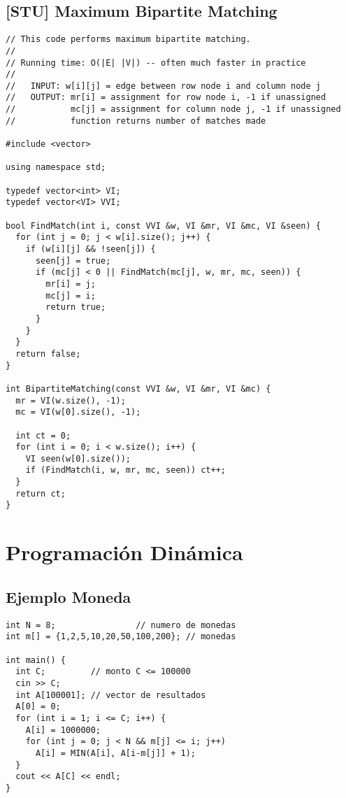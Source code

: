 \documentclass[10pt, a4, oneside]{article}
\begin{document}
\subsection{[STU] Maximum Bipartite Matching}
\begin{verbatim}
// This code performs maximum bipartite matching.
//
// Running time: O(|E| |V|) -- often much faster in practice
//
//   INPUT: w[i][j] = edge between row node i and column node j
//   OUTPUT: mr[i] = assignment for row node i, -1 if unassigned
//           mc[j] = assignment for column node j, -1 if unassigned
//           function returns number of matches made

#include <vector>

using namespace std;

typedef vector<int> VI;
typedef vector<VI> VVI;

bool FindMatch(int i, const VVI &w, VI &mr, VI &mc, VI &seen) {
  for (int j = 0; j < w[i].size(); j++) {
    if (w[i][j] && !seen[j]) {
      seen[j] = true;
      if (mc[j] < 0 || FindMatch(mc[j], w, mr, mc, seen)) {
        mr[i] = j;
        mc[j] = i;
        return true;
      }
    }
  }
  return false;
}

int BipartiteMatching(const VVI &w, VI &mr, VI &mc) {
  mr = VI(w.size(), -1);
  mc = VI(w[0].size(), -1);
  
  int ct = 0;
  for (int i = 0; i < w.size(); i++) {
    VI seen(w[0].size());
    if (FindMatch(i, w, mr, mc, seen)) ct++;
  }
  return ct;
}
\end{verbatim}

\section{Programación Dinámica}
\subsection{Ejemplo Moneda}
\begin{verbatim}
int N = 8;                // numero de monedas
int m[] = {1,2,5,10,20,50,100,200}; // monedas

int main() {
  int C;         // monto C <= 100000
  cin >> C;
  int A[100001]; // vector de resultados
  A[0] = 0;
  for (int i = 1; i <= C; i++) {
    A[i] = 1000000;
    for (int j = 0; j < N && m[j] <= i; j++)
      A[i] = MIN(A[i], A[i-m[j]] + 1);
  }
  cout << A[C] << endl;
}
\end{verbatim}
\end{document}
